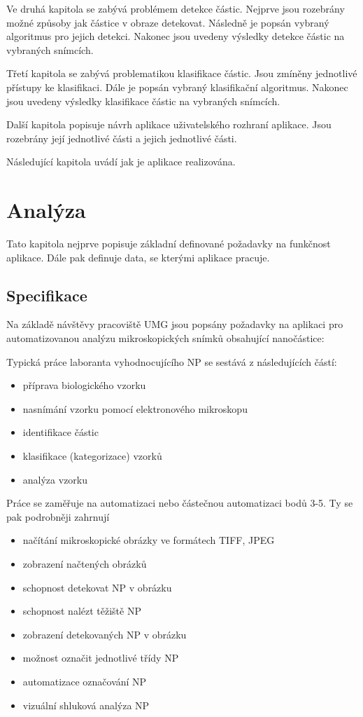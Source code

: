 \documentclass[11pt,twoside,a4paper,table]{book}
\begin{document}
Ve druhá kapitola se zabývá problémem detekce částic. Nejprve jsou rozebrány možné způsoby jak částice v obraze detekovat. Následně je popsán vybraný algoritmus pro jejich detekci. Nakonec jsou uvedeny výsledky detekce částic na vybraných snímcích.

Třetí kapitola se zabývá problematikou klasifikace částic. Jsou zmíněny jednotlivé přístupy ke klasifikaci. Dále je popsán vybraný klasifikační algoritmus. Nakonec jsou uvedeny výsledky klasifikace částic na vybraných snímcích.

Další kapitola popisuje návrh aplikace uživatelského rozhraní aplikace. Jsou rozebrány její jednotlivé části a jejich jednotlivé části.

Následující kapitola uvádí jak je aplikace realizována.


 




\chapter{Analýza}
Tato kapitola nejprve popisuje základní definované požadavky na funkčnost aplikace. Dále pak definuje data, se kterými aplikace pracuje. 

\section{Specifikace}
Na základě návštěvy pracoviště UMG jsou popsány požadavky na aplikaci pro automatizovanou analýzu mikroskopických snímků obsahující nanočástice:

Typická práce laboranta vyhodnocujícího NP se sestává z následujících částí:
\begin{itemize}
	\item příprava biologického vzorku
	\item nasnímání vzorku pomocí elektronového mikroskopu
	\item identifikace částic
	\item klasifikace (kategorizace) vzorků
	\item analýza vzorku
\end{itemize}
Práce se zaměřuje na automatizaci nebo částečnou automatizaci bodů 3-5. Ty se pak podrobněji zahrnují
\begin{itemize}
	\item načítání mikroskopické obrázky ve formátech TIFF, JPEG
	\item zobrazení načtených obrázků
	\item schopnost detekovat NP v obrázku
	\item schopnost nalézt těžiště NP
	\item zobrazení detekovaných NP v obrázku
	\item možnost označit jednotlivé třídy NP
	\item automatizace označování NP
	\item vizuální shluková analýza NP
\end{itemize}
\end{document}
